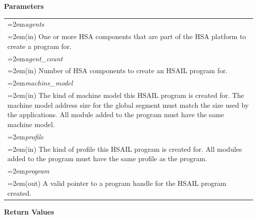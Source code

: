\documentclass[final,oneside]{book}
\newcommand{\hsaarg}[1]{\textit{#1}}
\begin{document}
\noindent\textbf{Parameters}\\[-6mm]
\noindent\begin{longtable}{@{}>{\hangindent=2em}p{\textwidth}}
\hsaarg{agents}\\\hspace{2em}(in) One or more HSA components that are part of the HSA platform to create a program for.\\[2mm]
\hsaarg{agent_\-count}\\\hspace{2em}(in) Number of HSA components to create an HSAIL program for.\\[2mm]
\hsaarg{machine_\-model}\\\hspace{2em}(in) The kind of machine model this HSAIL program is created for. The machine model address size for the global segment must match the size used by the applications. All module added to the program must have the same machine model.\\[2mm]
\hsaarg{profile}\\\hspace{2em}(in) The kind of profile this HSAIL program is created for. All modules added to the program must have the same profile as the program.\\[2mm]
\hsaarg{program}\\\hspace{2em}(out) A valid pointer to a program handle for the HSAIL program created.
\end{longtable}
\vspace{-5mm}\noindent\textbf{Return Values}\\[-6mm]
\end{document}
